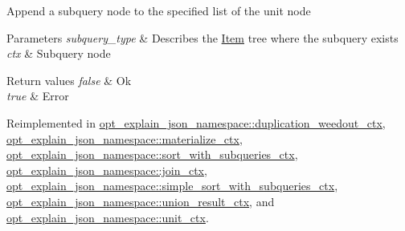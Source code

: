 Append a subquery node to the specified list of the unit node


\begin{DoxyParams}{Parameters}
{\em subquery\+\_\+type} & Describes the \mbox{\hyperlink{classItem}{Item}} tree where the subquery exists \\
\hline
{\em ctx} & Subquery node\\
\hline
\end{DoxyParams}

\begin{DoxyRetVals}{Return values}
{\em false} & Ok \\
\hline
{\em true} & Error \\
\hline
\end{DoxyRetVals}


Reimplemented in \mbox{\hyperlink{classopt__explain__json__namespace_1_1duplication__weedout__ctx_a2b570476015c26f58d8b7ec13cc11b4d}{opt\+\_\+explain\+\_\+json\+\_\+namespace\+::duplication\+\_\+weedout\+\_\+ctx}}, \mbox{\hyperlink{classopt__explain__json__namespace_1_1materialize__ctx_adcc1a9841e17f5abf74faf8d719d9700}{opt\+\_\+explain\+\_\+json\+\_\+namespace\+::materialize\+\_\+ctx}}, \mbox{\hyperlink{classopt__explain__json__namespace_1_1sort__with__subqueries__ctx_a57c77821336044d261cca101925dfdf2}{opt\+\_\+explain\+\_\+json\+\_\+namespace\+::sort\+\_\+with\+\_\+subqueries\+\_\+ctx}}, \mbox{\hyperlink{classopt__explain__json__namespace_1_1join__ctx_a5005892466618a6abcc3a5971c1d7433}{opt\+\_\+explain\+\_\+json\+\_\+namespace\+::join\+\_\+ctx}}, \mbox{\hyperlink{classopt__explain__json__namespace_1_1simple__sort__with__subqueries__ctx_a52373af3d533ac538155d1c4af9e8163}{opt\+\_\+explain\+\_\+json\+\_\+namespace\+::simple\+\_\+sort\+\_\+with\+\_\+subqueries\+\_\+ctx}}, \mbox{\hyperlink{classopt__explain__json__namespace_1_1union__result__ctx_a9e6c30603c339d970f2c8609fdda759a}{opt\+\_\+explain\+\_\+json\+\_\+namespace\+::union\+\_\+result\+\_\+ctx}}, and \mbox{\hyperlink{classopt__explain__json__namespace_1_1unit__ctx_a157b828a313f01ec8bd7c4a53644f6b2}{opt\+\_\+explain\+\_\+json\+\_\+namespace\+::unit\+\_\+ctx}}.

\mbox{\label{classopt__explain__json__namespace_1_1context_ae6606674e90fec03200823c35994873c}} 
